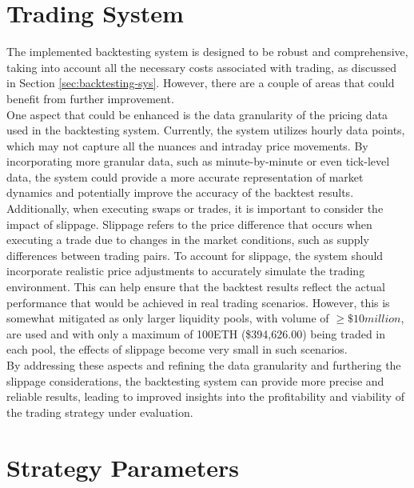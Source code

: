 \section{Trading System}
The implemented backtesting system is designed to be robust and comprehensive, taking into account all the necessary costs associated with trading, as discussed in Section \ref{sec:backtesting-sys}. However, there are a couple of areas that could benefit from further improvement.
\\[5mm]
One aspect that could be enhanced is the data granularity of the pricing data used in the backtesting system. Currently, the system utilizes hourly data points, which may not capture all the nuances and intraday price movements. By incorporating more granular data, such as minute-by-minute or even tick-level data, the system could provide a more accurate representation of market dynamics and potentially improve the accuracy of the backtest results.
\\[5mm]
Additionally, when executing swaps or trades, it is important to consider the impact of slippage. Slippage refers to the price difference that occurs when executing a trade due to changes in the market conditions, such as supply differences between trading pairs. To account for slippage, the system should incorporate realistic price adjustments to accurately simulate the trading environment. This can help ensure that the backtest results reflect the actual performance that would be achieved in real trading scenarios. However, this is somewhat mitigated as only larger liquidity pools, with volume of $\geq \$10 million$, are used and with only a maximum of 100ETH (\$394,626.00) being traded in each pool, the effects of slippage become very small in such scenarios.
\\[5mm]
By addressing these aspects and refining the data granularity and furthering the slippage considerations, the backtesting system can provide more precise and reliable results, leading to improved insights into the profitability and viability of the trading strategy under evaluation.

\section{Strategy Parameters}

